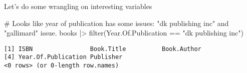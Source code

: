 \documentclass[
]{report}
\newenvironment{Shaded}{\begin{snugshade}}{\end{snugshade}}
\newcommand{\CommentTok}[1]{\textcolor[rgb]{0.37,0.37,0.37}{#1}}
\newcommand{\FunctionTok}[1]{\textcolor[rgb]{0.28,0.35,0.67}{#1}}
\newcommand{\NormalTok}[1]{\textcolor[rgb]{0.00,0.23,0.31}{#1}}
\newcommand{\OtherTok}[1]{\textcolor[rgb]{0.00,0.23,0.31}{#1}}
\newcommand{\SpecialCharTok}[1]{\textcolor[rgb]{0.37,0.37,0.37}{#1}}
\newcommand{\StringTok}[1]{\textcolor[rgb]{0.13,0.47,0.30}{#1}}
\begin{document}
\begin{Shaded}
\end{Shaded}

Let's do some wrangling on interesting variables

\begin{Shaded}
\begin{Highlighting}[]
\CommentTok{\# Looks like year of publication has some issues: "dk publishing inc" and "gallimard" issue. }
\NormalTok{books }\SpecialCharTok{|\textgreater{}} \FunctionTok{filter}\NormalTok{(Year.Of.Publication }\SpecialCharTok{==} \StringTok{"dk publishing inc"}\NormalTok{)}
\end{Highlighting}
\end{Shaded}

\begin{verbatim}
[1] ISBN                Book.Title          Book.Author        
[4] Year.Of.Publication Publisher          
<0 rows> (or 0-length row.names)
\end{verbatim}
\end{document}
